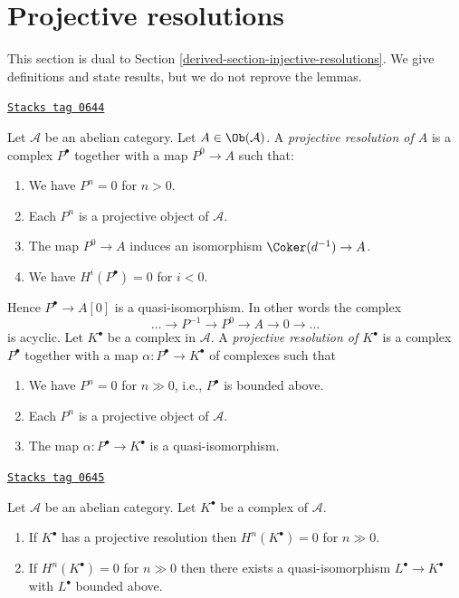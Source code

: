 \section{Projective resolutions}
\label{derived-section-projective-resolutions}
This section is dual to
Section \ref{derived-section-injective-resolutions}.
We give definitions and state results, but we do not reprove the lemmas.

\begin{definition}
\label{derived-definition-projective-resolution}
\href{https://stacks.math.columbia.edu/tag/0644}{\texttt{Stacks tag 0644}}

Let $\mathcal{A}$ be an abelian category.
Let $A \in \Ob(\mathcal{A})$.
A {\it projective resolution of $A$} is a complex
$P^\bullet$ together with a map $P^0 \to A$ such
that:
\begin{enumerate}
\item We have $P^n = 0$ for $n > 0$.
\item Each $P^n$ is a projective object of $\mathcal{A}$.
\item The map $P^0 \to A$ induces an isomorphism $\Coker(d^{-1}) \to A$.
\item We have $H^i(P^\bullet) = 0$ for $i < 0$.
\end{enumerate}
Hence $P^\bullet \to A[0]$ is a quasi-isomorphism.
In other words the complex
$$
\ldots \to P^{-1} \to P^0 \to A \to 0 \to \ldots
$$
is acyclic. Let $K^\bullet$ be a complex in $\mathcal{A}$.
A {\it projective resolution of $K^\bullet$} is a complex
$P^\bullet$ together with a map $\alpha : P^\bullet \to K^\bullet$
of complexes such that
\begin{enumerate}
\item We have $P^n = 0$ for $n \gg 0$, i.e., $P^\bullet$ is bounded above.
\item Each $P^n$ is a projective object of $\mathcal{A}$.
\item The map $\alpha : P^\bullet \to K^\bullet$ is a
quasi-isomorphism.
\end{enumerate}
\end{definition}

\begin{lemma}
\label{derived-lemma-cohomology-bounded-above}
\href{https://stacks.math.columbia.edu/tag/0645}{\texttt{Stacks tag 0645}}

Let $\mathcal{A}$ be an abelian category.
Let $K^\bullet$ be a complex of $\mathcal{A}$.
\begin{enumerate}
\item If $K^\bullet$ has a projective resolution then
$H^n(K^\bullet) = 0$ for $n \gg 0$.
\item If $H^n(K^\bullet) = 0$ for $n \gg 0$ then there
exists a quasi-isomorphism $L^\bullet \to K^\bullet$
with $L^\bullet$ bounded above.
\end{enumerate}
\end{lemma}

